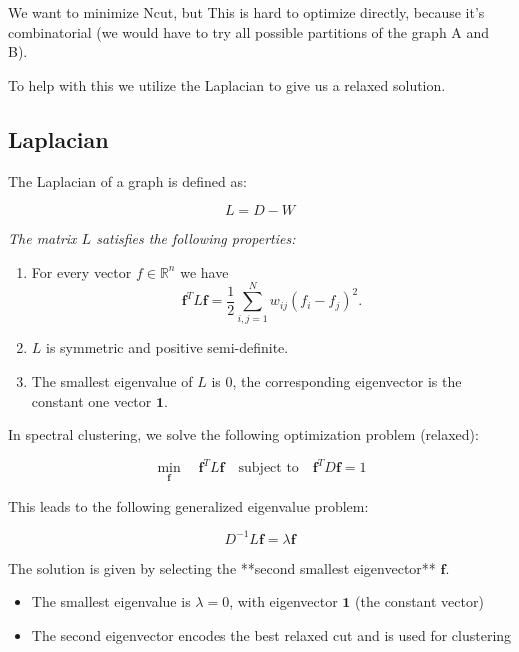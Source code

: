 \documentclass[11pt]{article}
\begin{document}
\medskip

We want to minimize Ncut, but This is hard to optimize directly, because it's combinatorial (we would have to try all possible partitions of the graph A and B).

\medskip

To help with this we utilize the Laplacian to give us a relaxed solution.

\subsection*{Laplacian}
The Laplacian of a graph is defined as:

\[
	L = D - W
\]


\textit{The matrix $L$ satisfies the following properties:}

\begin{enumerate}
	\item For every vector $f \in \mathbb{R}^n$ we have
	      \[
		      \mathbf{f}^T L \mathbf{f} = \frac{1}{2} \sum_{i,j=1}^{N} w_{ij}(f_i - f_j)^2.
	      \]

	\item $L$ is symmetric and positive semi-definite.

	\item The smallest eigenvalue of $L$ is $0$, the corresponding eigenvector is the constant one vector $\mathbf{1}$.
\end{enumerate}

\vspace{1em}

In spectral clustering, we solve the following optimization problem (relaxed):

\[
	\min_{\mathbf{f}} \quad \mathbf{f}^T L \mathbf{f} \quad \text{subject to} \quad \mathbf{f}^T D \mathbf{f} = 1
\]

This leads to the following generalized eigenvalue problem:

\[
	D^{-1} L \mathbf{f} = \lambda \mathbf{f}
\]

The solution is given by selecting the **second smallest eigenvector** \( \mathbf{f} \).

\begin{itemize}
	\item The smallest eigenvalue is \( \lambda = 0 \), with eigenvector \( \mathbf{1} \) (the constant vector)
	\item The second eigenvector encodes the best relaxed cut and is used for clustering
\end{itemize}
\end{document}
